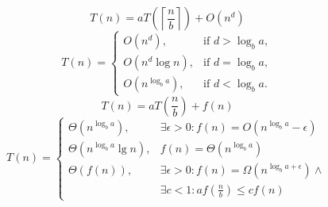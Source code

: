 \documentclass[a4paper]{article}
\begin{document}
\begin{multicols}{2}
\begin{tcolorbox}[title=Master Theroem]
    \begin{equation*}
        T(n) = aT\left(\left\lceil\frac{n}{b}\right\rceil\right) + O(n^d)
    \end{equation*}
    \begin{equation*}
        T(n) = \begin{cases}
            O(n^d),&\text{if } d>\log_b a, \\
            O(n^d\log n), &\text{if } d=\log_b a,\\
            O(n^{\log_b a}), &\text{if } d<\log_b a.
        \end{cases}
    \end{equation*}
    \tcblower
    \begin{equation*}
        T(n) = aT\left(\frac{n}{b}\right) + f(n)
    \end{equation*}
    \begin{equation*}
        T(n) = \begin{cases}
            \Theta(n^{\log_b a}), &\exists \epsilon>0: f(n) = O(n^{\log_b a}-\epsilon)\\
            \Theta(n^{\log_b a}\lg n),&f(n)=\Theta(n^{\log_b a})\\
            \Theta(f(n)),&\exists \epsilon>0:f(n)=\Omega(n^{\log_b a+\epsilon}) \land \\&\exists c<1:af\left(\frac{n}{b}\right)\leq cf(n)
        \end{cases}
    \end{equation*}
\end{tcolorbox}


\end{multicols}
\end{document}
